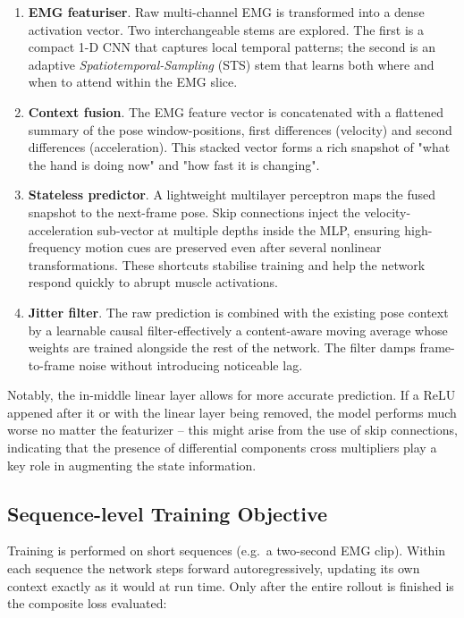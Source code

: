 \begin{enumerate}[label=\arabic*.]
  \item \textbf{EMG featuriser}.
        Raw multi-channel EMG is transformed into a dense activation vector.
        Two interchangeable stems are explored.
        The first is a compact 1-D CNN that captures local temporal patterns;
        the second is an adaptive \emph{Spatiotemporal-Sampling} (STS) stem that
        learns both where and when to attend within the EMG slice.
  \item \textbf{Context fusion}.
        The EMG feature vector is concatenated with a flattened summary of the
        pose window-positions, first differences (velocity) and second
        differences (acceleration). This stacked vector forms a rich snapshot
        of "what the hand is doing now" and "how fast it is changing".
  \item \textbf{Stateless predictor}.
        A lightweight multilayer perceptron maps the fused snapshot to the
        next-frame pose. Skip connections inject the velocity-acceleration
        sub-vector at multiple depths inside the MLP, ensuring high-frequency
        motion cues are preserved even after several nonlinear transformations.
        These shortcuts stabilise training and help the network respond quickly
        to abrupt muscle activations.
  \item \textbf{Jitter filter}.
        The raw prediction is combined with the existing pose context by a
        learnable causal filter-effectively a content-aware moving average
        whose weights are trained alongside the rest of the network. The
        filter damps frame-to-frame noise without introducing noticeable lag.
\end{enumerate}

Notably, the in-middle linear layer allows for more accurate prediction. If a ReLU appened after it or with the linear layer being removed, the model performs much worse no matter the featurizer -- this might arise from the use of skip connections, indicating that the presence of differential components cross multipliers play a key role in augmenting the state information.

\subsection{Sequence-level Training Objective}

Training is performed on short sequences (e.g.\ a two-second EMG clip).
Within each sequence the network steps forward autoregressively, updating its own context exactly as it would at run time. Only after the entire rollout is finished is the composite loss evaluated:

